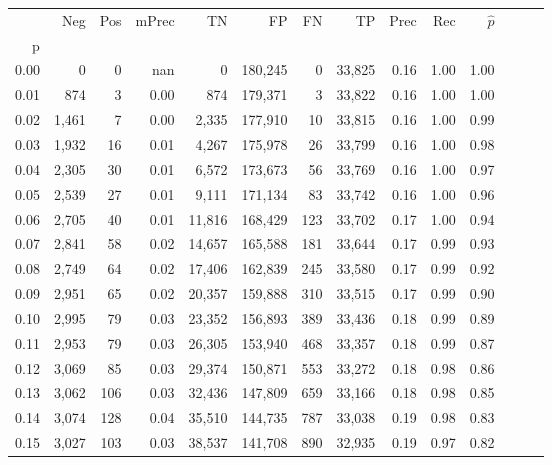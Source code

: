 \begin{tabular}{rrrrrrrrrrrrrr}
\toprule
{} &    Neg &  Pos & mPrec &       TN &       FP &      FN &      TP &  Prec &   Rec & $\hat{p}$ \\
p    &        &      &       &          &          &         &         &       &       &           \\
\midrule
0.00 &      0 &    0 &   nan &        0 &  180,245 &       0 &  33,825 &  0.16 &  1.00 &      1.00 \\
0.01 &    874 &    3 &  0.00 &      874 &  179,371 &       3 &  33,822 &  0.16 &  1.00 &      1.00 \\
0.02 &  1,461 &    7 &  0.00 &    2,335 &  177,910 &      10 &  33,815 &  0.16 &  1.00 &      0.99 \\
0.03 &  1,932 &   16 &  0.01 &    4,267 &  175,978 &      26 &  33,799 &  0.16 &  1.00 &      0.98 \\
0.04 &  2,305 &   30 &  0.01 &    6,572 &  173,673 &      56 &  33,769 &  0.16 &  1.00 &      0.97 \\
0.05 &  2,539 &   27 &  0.01 &    9,111 &  171,134 &      83 &  33,742 &  0.16 &  1.00 &      0.96 \\
0.06 &  2,705 &   40 &  0.01 &   11,816 &  168,429 &     123 &  33,702 &  0.17 &  1.00 &      0.94 \\
0.07 &  2,841 &   58 &  0.02 &   14,657 &  165,588 &     181 &  33,644 &  0.17 &  0.99 &      0.93 \\
0.08 &  2,749 &   64 &  0.02 &   17,406 &  162,839 &     245 &  33,580 &  0.17 &  0.99 &      0.92 \\
0.09 &  2,951 &   65 &  0.02 &   20,357 &  159,888 &     310 &  33,515 &  0.17 &  0.99 &      0.90 \\
0.10 &  2,995 &   79 &  0.03 &   23,352 &  156,893 &     389 &  33,436 &  0.18 &  0.99 &      0.89 \\
0.11 &  2,953 &   79 &  0.03 &   26,305 &  153,940 &     468 &  33,357 &  0.18 &  0.99 &      0.87 \\
0.12 &  3,069 &   85 &  0.03 &   29,374 &  150,871 &     553 &  33,272 &  0.18 &  0.98 &      0.86 \\
0.13 &  3,062 &  106 &  0.03 &   32,436 &  147,809 &     659 &  33,166 &  0.18 &  0.98 &      0.85 \\
0.14 &  3,074 &  128 &  0.04 &   35,510 &  144,735 &     787 &  33,038 &  0.19 &  0.98 &      0.83 \\
0.15 &  3,027 &  103 &  0.03 &   38,537 &  141,708 &     890 &  32,935 &  0.19 &  0.97 &      0.82 \\

\end{tabular}
